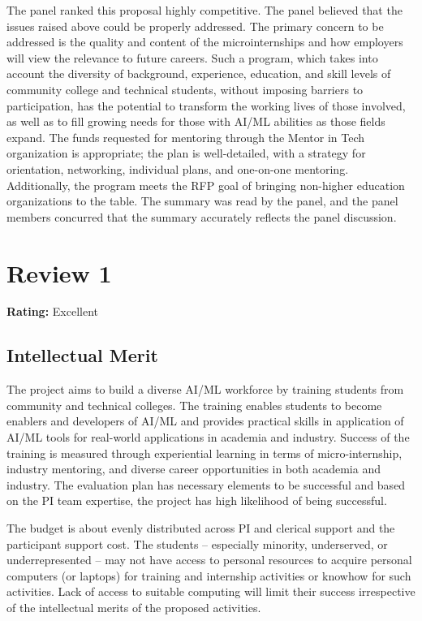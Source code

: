 The panel ranked this proposal highly competitive. The panel believed that the issues raised above could be properly addressed. The primary concern to be addressed is the quality and content of the microinternships and how employers will view the relevance to future careers. Such a program, which takes into account the diversity of background, experience, education, and skill levels of community college and technical students, without imposing barriers to participation, has the potential to transform the working lives of those involved, as well as to fill growing needs for those with AI/ML abilities as those fields expand. The funds requested for mentoring through the Mentor in Tech organization is appropriate; the plan is well-detailed, with a strategy for orientation, networking, individual plans, and one-on-one mentoring. Additionally, the program meets the RFP goal of bringing non-higher education organizations to the table. The summary was read by the panel, and the panel members concurred that the summary accurately reflects the panel discussion.

\newpage
\section{Review 1}
\textbf{Rating:} Excellent

\subsection{Intellectual Merit}

The project aims to build a diverse AI/ML workforce by training students from community and technical colleges. The training enables students to become enablers and developers of AI/ML and provides practical skills in application of AI/ML tools for real-world applications in academia and industry. Success of the training is measured through experiential learning in terms of micro-internship, industry mentoring, and diverse career opportunities in both academia and industry. The evaluation plan has necessary elements to be successful and based on the PI team expertise, the project has high likelihood of being successful. 

The budget is about evenly distributed across PI and clerical support and the participant support cost. The students – especially minority, underserved, or underrepresented – may not have access to personal resources to acquire personal computers (or laptops) for training and internship activities or knowhow for such activities. Lack of access to suitable computing will limit their success irrespective of the intellectual merits of the proposed activities. 

